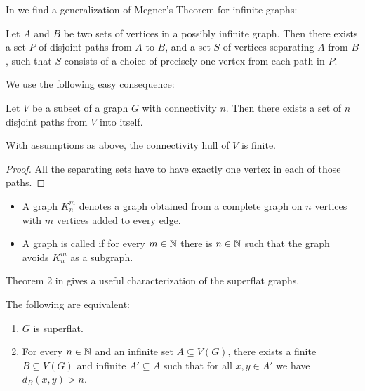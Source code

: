 In \cite{infinite_megner} we find a generalization of Megner's Theorem for infinite graphs:

\begin{Theorem}
  Let $A$ and $B$ be two sets of vertices in a possibly infinite graph. Then there exists a set $P$ of disjoint paths from $A$ to $B$, and a set $S$ of vertices separating $A$ from $B$, such that $S$ consists of a choice of precisely one vertex from each path in $P$.
\end{Theorem}

We use the following easy consequence:

\begin{Corollary} \label{cr_disjoint_paths}
  Let $V$ be a subset of a graph $G$ with connectivity $n$. Then there exists a set of $n$ disjoint paths from $V$ into itself.
\end{Corollary}

\begin{Corollary} \label{cr_hull_finite}
  With assumptions as above, the connectivity hull of $V$ is finite.
\end{Corollary}

\begin{proof}
  All the separating sets have to have exactly one vertex in each of those paths. 
\end{proof}

\begin{Definition}
  \begin{itemize}
    \item A graph $K^m_n$ denotes a graph obtained from a complete graph on $n$ vertices with $m$ vertices added to every edge.
    \item A graph is called  if for every $m \in \mathbb{N}$ there is $n \in \mathbb{N}$ such that the graph avoids $K^m_n$ as a subgraph. 
  \end{itemize}
\end{Definition}

Theorem 2 in \cite{stable_graphs} gives a useful characterization of the superflat graphs.

\begin{Theorem} \label{th_superflat_equivalence}
  The following are equivalent:
  \begin{enumerate}
  \item $G$ is superflat.
  \item For every $n \in \mathbb{N}$ and an infinite set $A \subseteq V(G)$, there exists a finite $B \subseteq V(G)$ and infinite $A' \subseteq A$ such that for all $x,y \in A'$ we have $d_{B}(x, y) > n$.
  \end{enumerate}
\end{Theorem}

